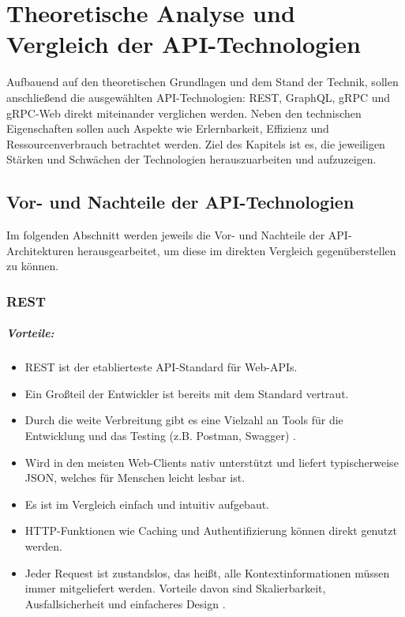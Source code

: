 \chapter{Theoretische Analyse und Vergleich der API-Technologien}
\label{chap:intro}
\chapterstart
Aufbauend auf den theoretischen Grundlagen und dem Stand der Technik, sollen anschließend die ausgewählten API-Technologien: REST, GraphQL, gRPC und gRPC-Web direkt miteinander verglichen werden. Neben den technischen Eigenschaften sollen auch Aspekte wie Erlernbarkeit, Effizienz und Ressourcenverbrauch betrachtet werden. Ziel des Kapitels ist es, die jeweiligen Stärken und Schwächen der Technologien herauszuarbeiten und aufzuzeigen.

\section{Vor- und Nachteile der API-Technologien}
Im folgenden Abschnitt werden jeweils die Vor- und Nachteile der API-Architekturen herausgearbeitet, um diese im direkten Vergleich gegenüberstellen zu können. 
\subsection{REST}

\paragraph{Vorteile:}
\begin{itemize}
	\item REST ist der etablierteste API-Standard für Web-APIs.
	\item Ein Großteil der Entwickler ist bereits mit dem Standard vertraut.
	\item Durch die weite Verbreitung gibt es eine Vielzahl an Tools für die Entwicklung und das Testing (z.B. Postman, Swagger) \parencite{postman2022, postman2023}.
	\item Wird in den meisten Web-Clients nativ unterstützt und liefert typischerweise JSON, welches für Menschen leicht lesbar ist.
	\item Es ist im Vergleich einfach und intuitiv aufgebaut.
	\item HTTP-Funktionen wie Caching und Authentifizierung können direkt genutzt werden.
	\item Jeder Request ist zustandslos, das heißt, alle Kontextinformationen müssen immer mitgeliefert werden. Vorteile davon sind Skalierbarkeit, Ausfallsicherheit und einfacheres Design \parencite{fielding2000rest}. 
\end{itemize}

